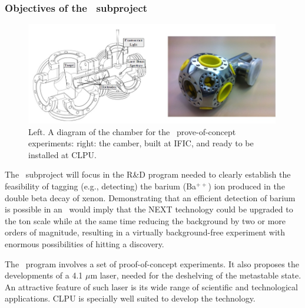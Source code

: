 %

\subsubsection*{Objectives of the \BATA\ subproject}

\begin{figure}
\begin{center}
\includegraphics[width=0.99\textwidth]{img/BChamber.jpg}
\caption{\small Left. A diagram of the chamber for the \BATA\ prove-of-concept experiments: right: the camber, built at IFIC, and ready to be installed at CLPU.}
\label{fig:chamber}
\end{center}
\end{figure}

The \BATA\ subproject will focus in the R\&D program needed to clearly establish the feasibility of tagging (e.g., detecting) the barium (Ba$^{++}$) ion produced in the double beta decay of xenon. Demonstrating that an efficient detection of barium is possible in an \HPXE\ would imply that the NEXT technology could be upgraded to the ton scale while at the same time reducing the background by two or more orders of magnitude, resulting in a virtually background-free experiment with enormous possibilities of hitting a discovery. 

The \BATA\ program involves a set of proof-of-concept experiments. It also proposes the developments of a 4.1 $\mu$m laser, needed for the deshelving of the metastable state. An attractive feature of such laser is its wide range of scientific and technological applications. CLPU is specially well suited to develop the technology.


